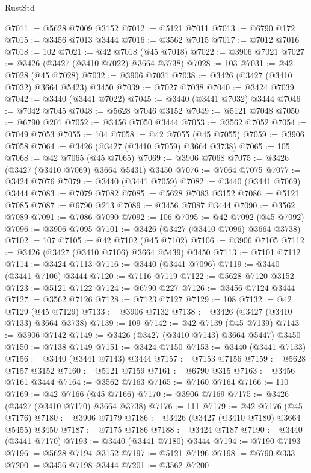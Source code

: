 \begin{lexlean}{RustStd}
\begin{coremodule}
@7011 := @5628 @7009 @3152
@7012 := @5121 @7011
@7013 := @6790 @172
@7015 := @3456 @7013 @3444
@7016 := @3562 @7015
@7017 := @7012 @7016
@7018 := 102
@7021 := @42 @7018 (@45 @7018)
@7022 := @3906 @7021
@7027 := @3426 (@3427 (@3410 @7022) @3664 @3738)
@7028 := 103
@7031 := @42 @7028 (@45 @7028)
@7032 := @3906 @7031
@7038 := @3426 (@3427 (@3410 @7032) @3664 @5423) @3450
@7039 := @7027 @7038
@7040 := @3424 @7039
@7042 := @3440 (@3441 @7022)
@7045 := @3440 (@3441 @7032) @3444
@7046 := @7042 @7045
@7048 := @5628 @7046 @3152
@7049 := @5121 @7048
@7050 := @6790 @201
@7052 := @3456 @7050 @3444
@7053 := @3562 @7052
@7054 := @7049 @7053
@7055 := 104
@7058 := @42 @7055 (@45 @7055)
@7059 := @3906 @7058
@7064 := @3426 (@3427 (@3410 @7059) @3664 @3738)
@7065 := 105
@7068 := @42 @7065 (@45 @7065)
@7069 := @3906 @7068
@7075 := @3426 (@3427 (@3410 @7069) @3664 @5431) @3450
@7076 := @7064 @7075
@7077 := @3424 @7076
@7079 := @3440 (@3441 @7059)
@7082 := @3440 (@3441 @7069) @3444
@7083 := @7079 @7082
@7085 := @5628 @7083 @3152
@7086 := @5121 @7085
@7087 := @6790 @213
@7089 := @3456 @7087 @3444
@7090 := @3562 @7089
@7091 := @7086 @7090
@7092 := 106
@7095 := @42 @7092 (@45 @7092)
@7096 := @3906 @7095
@7101 := @3426 (@3427 (@3410 @7096) @3664 @3738)
@7102 := 107
@7105 := @42 @7102 (@45 @7102)
@7106 := @3906 @7105
@7112 := @3426 (@3427 (@3410 @7106) @3664 @5439) @3450
@7113 := @7101 @7112
@7114 := @3424 @7113
@7116 := @3440 (@3441 @7096)
@7119 := @3440 (@3441 @7106) @3444
@7120 := @7116 @7119
@7122 := @5628 @7120 @3152
@7123 := @5121 @7122
@7124 := @6790 @227
@7126 := @3456 @7124 @3444
@7127 := @3562 @7126
@7128 := @7123 @7127
@7129 := 108
@7132 := @42 @7129 (@45 @7129)
@7133 := @3906 @7132
@7138 := @3426 (@3427 (@3410 @7133) @3664 @3738)
@7139 := 109
@7142 := @42 @7139 (@45 @7139)
@7143 := @3906 @7142
@7149 := @3426 (@3427 (@3410 @7143) @3664 @5447) @3450
@7150 := @7138 @7149
@7151 := @3424 @7150
@7153 := @3440 (@3441 @7133)
@7156 := @3440 (@3441 @7143) @3444
@7157 := @7153 @7156
@7159 := @5628 @7157 @3152
@7160 := @5121 @7159
@7161 := @6790 @315
@7163 := @3456 @7161 @3444
@7164 := @3562 @7163
@7165 := @7160 @7164
@7166 := 110
@7169 := @42 @7166 (@45 @7166)
@7170 := @3906 @7169
@7175 := @3426 (@3427 (@3410 @7170) @3664 @3738)
@7176 := 111
@7179 := @42 @7176 (@45 @7176)
@7180 := @3906 @7179
@7186 := @3426 (@3427 (@3410 @7180) @3664 @5455) @3450
@7187 := @7175 @7186
@7188 := @3424 @7187
@7190 := @3440 (@3441 @7170)
@7193 := @3440 (@3441 @7180) @3444
@7194 := @7190 @7193
@7196 := @5628 @7194 @3152
@7197 := @5121 @7196
@7198 := @6790 @333
@7200 := @3456 @7198 @3444
@7201 := @3562 @7200

\end{coremodule}
\end{lexlean}
